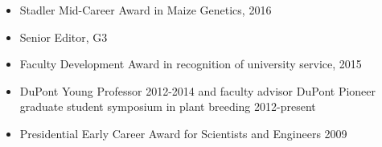 \documentclass[10pt]{article}
\begin{document}
\begin{itemize} \setlength{\itemsep}{0pt} \setlength{\parskip}{2pt} \setlength{\parsep}{0pt}
\item Stadler Mid-Career Award in Maize Genetics, 2016
\item Senior Editor, G3
\item Faculty Development Award in recognition of university service, 2015
\item DuPont Young Professor 2012-2014 and faculty advisor DuPont Pioneer graduate student symposium in plant breeding 2012-present
\item Presidential Early Career Award for Scientists and Engineers 2009
\end{itemize}

\end{document}
